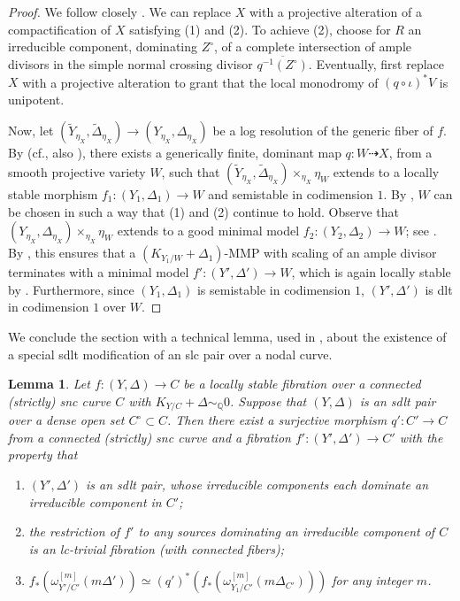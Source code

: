 \documentclass{amsart}
\newtheorem{lemma}[theorem]{Lemma}
\theoremstyle{definition}
\theoremstyle{remark}
\def\bQ{\mathbb{Q}}
\numberwithin{equation}{section}
\begin{document}
\begin{proof} We follow closely \cite[Thm.~4.59]{kbook}. 
We can replace $X$
with a projective alteration of a compactification of $X$ satisfying (1) and (2).
To achieve (2), choose for $R$ an irreducible component, dominating $Z^{\circ}$, of a complete intersection of ample divisors in the simple normal crossing divisor $\overline{q^{-1}(Z^{\circ})}$. Eventually, first replace $X$ with a projective alteration to grant that the local monodromy of $(q \circ \iota)^{*}V$ is unipotent. 

Now, let $(\widetilde{Y}_{\eta_X}, \widetilde{\Delta}_{\eta_X}) \to (Y_{\eta_X}, \Delta_{\eta_X})$ be a log resolution of the generic fiber of $f$.
By \cite{AK00} (cf., also \cite{AGK2020}), there exists a generically finite, dominant map $q \colon W \dashrightarrow X$, from a smooth projective variety $W$, such that $(\widetilde{Y}_{\eta_X}, \widetilde{\Delta}_{\eta_X}) \times_{\eta_X} \eta_{W}$
extends to a locally stable morphism $f_{1} \colon (Y_{1}, \Delta_1) \to W$ and semistable in codimension $1$. By \cite[Thm.~4.7]{AGK2020}, $W$ can be chosen in such a way that (1) and (2) continue to hold. Observe that
$(Y_{\eta_X}, \Delta_{\eta_X}) \times_{\eta_X} \eta_{W}$ extends to a good minimal model $f_2 \colon (Y_2, \Delta_2) \to W$; see \cite[Thm.~1.1]{HX13}. By \cite[Thm.~1.7]{HH2020}, this ensures that a 
$(K_{Y_1/W} + \Delta_1)$-MMP with scaling 
of an ample divisor terminates with a minimal model 
$f' \colon (Y', \Delta') \to W$, which is again locally stable by \cite[Cor.~4.57]{kbook}.
Furthermore, since $(Y_{1}, \Delta_1)$ is semistable in codimension $1$, $(Y', \Delta')$ is dlt in codimension $1$ over $W$.
\end{proof}

We conclude the section with a technical lemma, used in , about the existence of a special sdlt modification of an slc pair over a nodal curve.

\begin{lemma}\label{lem:sdltmodification}
Let $f \colon (Y, \Delta) \to C$ be a locally stable fibration 
over a connected (strictly) snc curve $C$ with $K_{Y/C}+\Delta \sim_{\bQ} 0$. Suppose that $(Y, \Delta)$ is an sdlt pair over a dense open set $C^{\circ} \subset C$. Then there exist a
surjective
morphism $q' \colon C' \to C$ from a connected (strictly) snc curve and a fibration
$f' \colon (Y', \Delta') \to C'$ with the property that 
\begin{enumerate}
\item\label{item1:sdlt} $(Y', \Delta')$ is an sdlt pair, whose irreducible components each dominate an irreducible component in $C'$;
\item\label{item:connectednesssource} the restriction of $f'$ to any sources dominating an irreducible component of $C$ is an lc-trivial fibration (with connected fibers);
\item\label{item:pushforward} 
$f_* (\omega^{[m]}_{Y'/C'}(m\Delta')) \simeq (q')^*(f_*(\omega^{[m]}_{Y_1/C'}(m\Delta_{C'})))$ 
for any integer $m$.
\end{enumerate}
\end{lemma}
\end{document}
